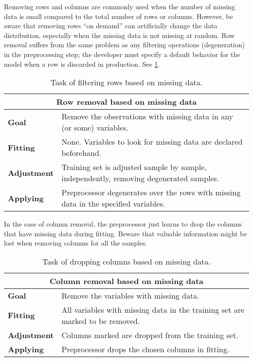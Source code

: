 Removing rows and columns are commonly used when the number of missing data is small
compared to the total number of rows or columns.  However, be aware that removing rows
``on demand'' can
artificially change the data distribution, especially when the missing data is not missing at
random.  Row removal suffers from the same problem as any filtering operations
(degeneration) in the preprocessing step; the developer must specify a default behavior
for the model when a row is discarded in production.  See \cref{tab:row-removal-missing}.

\begin{table}\caption{Task of filtering rows based on missing data.}
  \centering
  \begin{tabular}{lp{6cm}}
    \toprule
    \multicolumn{2}{c}{\textbf{Row removal based on missing data}} \\
    \midrule
    \textbf{Goal} &
      Remove the observations with missing data in any (or some) variables. \\
    \textbf{Fitting} &
      None. Variables to look for missing data are declared beforehand. \\
    \textbf{Adjustment} &
      Training set is adjusted sample by sample, independently, removing
      degenerated samples. \\
    \textbf{Applying} &
      Preprocessor degenerates over the rows with missing data in the specified variables.
      \\
    \bottomrule
  \end{tabular}
  \label{tab:row-removal-missing}
\end{table}

In the case of column removal, the
preprocessor just learns to drop the columns that have missing data during fitting.
Beware that valuable information might be lost when removing columns for all the samples.

\begin{table}\caption{Task of dropping columns based on missing data.}
  \centering
  \begin{tabular}{lp{6cm}}
    \toprule
    \multicolumn{2}{c}{\textbf{Column removal based on missing data}} \\
    \midrule
    \textbf{Goal} &
      Remove the variables with missing data. \\
    \textbf{Fitting} &
      All variables with missing data in the training set are marked to be removed. \\
    \textbf{Adjustment} &
      Columns marked are dropped from the training set. \\
    \textbf{Applying} &
      Preprocessor drops the chosen columns in fitting. \\
    \bottomrule
  \end{tabular}
  \label{tab:col-drop-missing}
\end{table}

